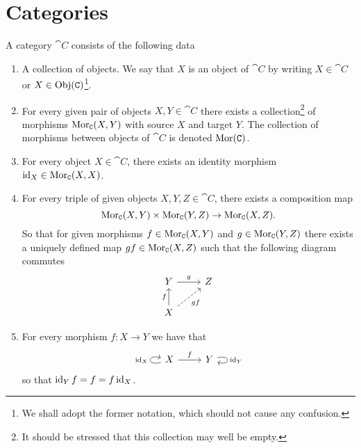 \section{Categories}

\begin{definition}[Category]\label{def: category}
    A category \(\cat C\) consists of the following data
    \begin{enumerate}[(C1)]
        \item A collection of objects. We say that \(X\) is an object of \(\cat C\)
              by writing \(X \in \cat C\) or \(X \in \operatorname{Obj}(\texttt C)\)\footnote{We shall adopt
                  the former notation, which should not cause any confusion.}.
        \item For every given pair of objects \(X, Y \in \cat C\) there exists a
              collection\footnote{It should be stressed that this collection may well be empty.}
              of morphisms \(\operatorname{Mor}_{\texttt C}(X, Y)\) with source \(X\) and
              target \(Y\). The collection of morphisms between objects of \(\cat C\) is
              denoted \(\operatorname{Mor}(\texttt C)\).
        \item For every object \(X \in \cat C\), there exists an identity morphism
              \(\operatorname{id}_X \in \operatorname{Mor}_{\texttt C}(X, X)\).
        \item For every triple of given objects \(X, Y, Z \in \cat C\), there exists
              a composition map
              \[
                  \operatorname{Mor}_{\texttt C}(X, Y) \times \operatorname{Mor}_{\texttt C}(Y, Z) \to \operatorname{Mor}_{\texttt C}(X, Z).
              \]
              So that for given morphisms \(f \in \operatorname{Mor}_{\texttt C}(X, Y)\) and \(g \in
              \operatorname{Mor}_{\texttt C}(Y, Z)\) there exists a uniquely defined map \(g  f \in
              \operatorname{Mor}_{\texttt C}(X, Z)\) such that the following diagram commutes
              \[
                  \begin{tikzcd}
                      Y \ar[r, "g"]
                      &Z \\
                      X \ar[u, "f"] \ar[ru, dashed, swap, "g  f"]
                  \end{tikzcd}
              \]
        \item For every morphism \(f: X \to Y\) we have that
              \[
                  \begin{tikzcd}
                      X \ar[r, "f"] \ar[loop left, "\Id_X"] &Y \ar[loop right, "\Id_Y"]
                  \end{tikzcd}
              \]
              so that \(\operatorname{id}_Y  f = f = f  \operatorname{id}_X\).

\end{enumerate}
\end{definition}
